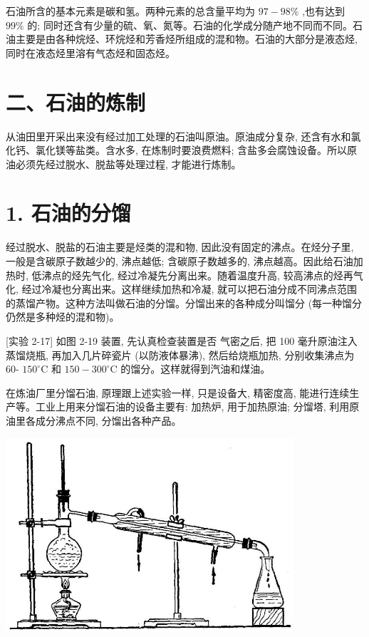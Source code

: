 \documentclass[10pt]{article}
\begin{document}
石油所含的基本元素是碳和氢。两种元素的总含量平均为 \({97} - {98}\%\) ,也有达到 \({99}\%\) 的; 同时还含有少量的硫、氧、氮等。石油的化学成分随产地不同而不同。石油主要是由各种烷烃、环烷烃和芳香烃所组成的混和物。石油的大部分是液态烃, 同时在液态烃里溶有气态烃和固态烃。

\section*{二、石油的炼制}

从油田里开采出来没有经过加工处理的石油叫原油。原油成分复杂, 还含有水和氯化钙、氯化镁等盐类。含水多, 在炼制时要浪费燃料; 含盐多会腐蚀设备。所以原油必须先经过脱水、脱盐等处理过程, 才能进行炼制。

\section*{1. 石油的分馏}

经过脱水、脱盐的石油主要是烃类的混和物, 因此没有固定的沸点。在烃分子里, 一般是含碳原子数越少的, 沸点越低; 含碳原子数越多的, 沸点越高。因此给石油加热时, 低沸点的烃先气化, 经过冷凝先分离出来。随着温度升高, 较高沸点的烃再气化, 经过冷凝也分离出来。这样继续加热和冷凝, 就可以把石油分成不同沸点范围的蒸馏产物。这种方法叫做石油的分馏。分馏出来的各种成分叫馏分 (每一种馏分仍然是多种烃的混和物)。

[实验 2-17] 如图 2-19 装置, 先认真检查装置是否 气密之后, 把 100 毫升原油注入蒸馏烧瓶, 再加入几片碎瓷片 (以防液体暴沸), 然后给烧瓶加热, 分别收集沸点为 60- \({150}^{ \circ }\mathrm{C}\) 和 \({150} - {300}^{ \circ }\mathrm{C}\) 的馏分。这样就得到汽油和煤油。

在炼油厂里分馏石油, 原理跟上述实验一样, 只是设备大, 精密度高, 能进行连续生产等。工业上用来分馏石油的设备主要有: 加热炉, 用于加热原油; 分馏塔, 利用原油里各成分沸点不同, 分馏出各种产品。

\begin{center}
\includegraphics[max width=0.8\textwidth]{images/01912d16-be99-77bb-9535-4f3ed8d9946f_94_296906.jpg}
\end{center}
\end{document}
